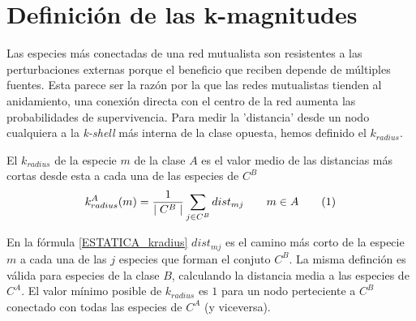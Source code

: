 \section{Definición de las k-magnitudes}
\label{sec:ESTATICA_defkmagnitudes}

Las especies más conectadas de una red mutualista son resistentes a las perturbaciones externas porque el beneficio que reciben depende de múltiples fuentes. Esta parece ser la razón por la que las redes mutualistas tienden al anidamiento, una conexión directa con el centro de la red aumenta las probabilidades de supervivencia. Para medir la 'distancia' desde un nodo cualquiera a la \textit{k-shell} más interna de la clase opuesta, hemos definido el \textit{$k_{radius}$}.

\begin{theo} 
El \textit{$k_{radius}$} de la especie $m$ de la clase $A$ es el valor medio de las distancias más cortas desde esta a cada una de las especies de $C^B$
\begin{align*}
\displaystyle
k^A_{radius}(m) = \frac{1}{\mid C^{B} \mid}\sum\limits_{j \in C^{B}} dist_{mj}  \qquad   m \in A
\stepcounter{equation}\tag{\theequation}\label{kradius}
\end{align*}
\label{ESTATICA_kradius}
\end{theo}

En la fórmula \ref{ESTATICA_kradius} $dist_{mj}$ es el camino más corto de la especie $m$ a cada una de las $j$ especies que forman el conjuto $C^B$. La misma definción es válida para especies de la clase $B$, calculando la distancia media a las especies de $C^A$. El valor mínimo posible de $k_{radius}$ es $1$ para un nodo perteciente a $C^B$ conectado con todas las especies de $C^A$ (y viceversa).


